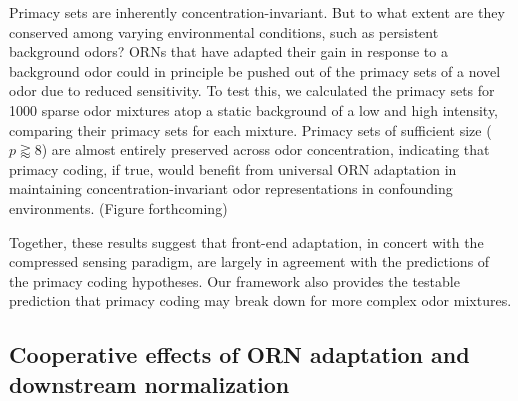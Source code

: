 \documentclass[9pt,twocolumn,twoside,lineno]{pnas-new}
\begin{document}
Primacy sets are inherently concentration-invariant. But to what extent are they conserved among varying environmental conditions, such as persistent background odors? ORNs that have adapted their gain in response to a background odor could in principle be pushed out of the primacy sets of a novel odor due to reduced sensitivity. To test this, we calculated the primacy sets for 1000  sparse odor mixtures atop a static background of a low and high intensity, comparing their primacy sets for each mixture. Primacy sets of sufficient size ($p \gtrapprox 8$) are almost entirely preserved across odor concentration, indicating that primacy coding, if true, would benefit from universal ORN  adaptation in maintaining concentration-invariant odor representations in confounding environments. (Figure forthcoming)


Together, these results suggest that front-end adaptation, in concert with the compressed sensing paradigm, are largely in agreement with the predictions of the primacy coding hypotheses. Our framework also provides the testable prediction that primacy coding may break down for more complex odor mixtures.

\subsection{Cooperative effects of ORN adaptation and  downstream normalization}
\end{document}
